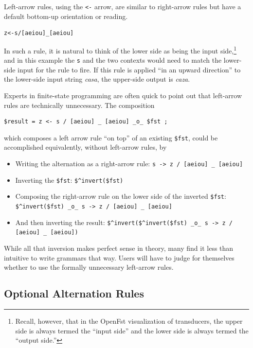 \documentclass[letterpaper,12pt]{article}
\begin{document}
Left-arrow rules, using the \texttt{<-} arrow, are similar to right-arrow
rules but have a default bottom-up orientation or reading.

\begin{alltt}
z <- s / [aeiou] _ [aeiou]
\end{alltt}

\noindent
In such a rule, it is natural to think of the lower side as being the input side,\footnote{Recall, however, that in the
OpenFst visualization of transducers,
the upper side is always termed the ``input side'' and the lower side is always termed the ``output side.''} and in
this example the \verb!s! and the two contexts would need to match the lower-side input for the rule to fire.
If this rule is applied ``in an upward direction'' to the lower-side input string
\emph{casa}, the upper-side output is \emph{caza}. 

Experts in finite-state programming are often quick to point out that left-arrow rules
are technically unnecessary.  The composition

\begin{Verbatim}[fontsize=\small]
$result = z <- s / [aeiou] _ [aeiou] _o_ $fst ;
\end{Verbatim}

\noindent
which composes a left arrow rule ``on top'' of an existing \verb!$fst!,
could be accomplished equivalently, without left-arrow rules, by 

\begin{itemize}
\item
Writing the alternation as a right-arrow rule:  \verb!s -> z / [aeiou] _ [aeiou]!
\item
Inverting the \verb!$fst!:  \verb!$^invert($fst)!
\item
Composing the right-arrow rule on the lower side of the inverted \verb!$fst!:
\verb!$^invert($fst) _o_ s -> z / [aeiou] _ [aeiou]!
\item
And then inverting the result:  
\verb!$^invert($^invert($fst) _o_ s -> z / [aeiou] _ [aeiou])!
\end{itemize}


\noindent 
While all that inversion makes perfect sense in theory, many find it less than intuitive to write grammars that way.
Users will have to judge for themselves whether to use
the formally unnecessary left-arrow rules.

\subsection{Optional Alternation Rules}
\end{document}
